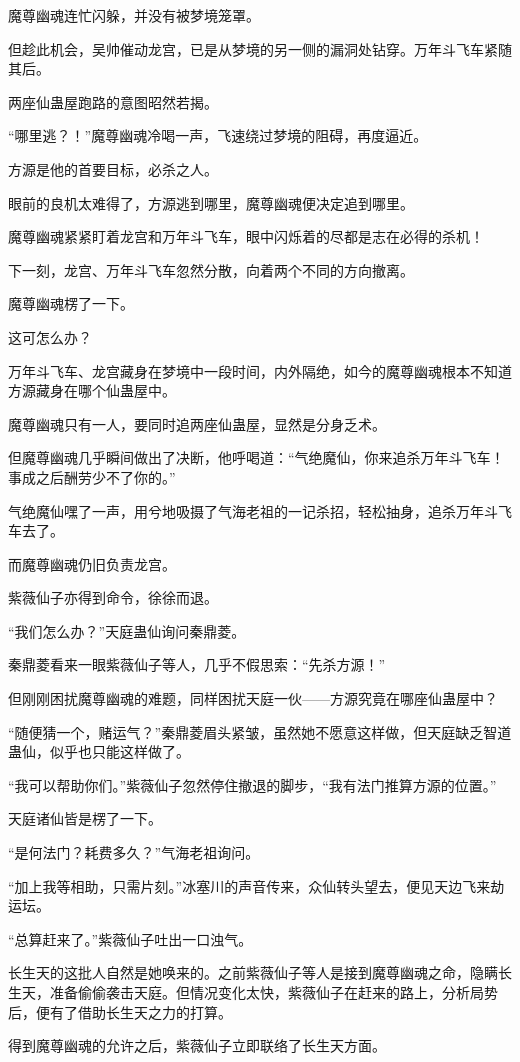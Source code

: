 \begin{this_body}
魔尊幽魂连忙闪躲，并没有被梦境笼罩。

但趁此机会，吴帅催动龙宫，已是从梦境的另一侧的漏洞处钻穿。万年斗飞车紧随其后。

两座仙蛊屋跑路的意图昭然若揭。

“哪里逃？！”魔尊幽魂冷喝一声，飞速绕过梦境的阻碍，再度逼近。

方源是他的首要目标，必杀之人。

眼前的良机太难得了，方源逃到哪里，魔尊幽魂便决定追到哪里。

魔尊幽魂紧紧盯着龙宫和万年斗飞车，眼中闪烁着的尽都是志在必得的杀机！

下一刻，龙宫、万年斗飞车忽然分散，向着两个不同的方向撤离。

魔尊幽魂楞了一下。

这可怎么办？

万年斗飞车、龙宫藏身在梦境中一段时间，内外隔绝，如今的魔尊幽魂根本不知道方源藏身在哪个仙蛊屋中。

魔尊幽魂只有一人，要同时追两座仙蛊屋，显然是分身乏术。

但魔尊幽魂几乎瞬间做出了决断，他呼喝道：“气绝魔仙，你来追杀万年斗飞车！事成之后酬劳少不了你的。”

气绝魔仙嘿了一声，用兮地吸摄了气海老祖的一记杀招，轻松抽身，追杀万年斗飞车去了。

而魔尊幽魂仍旧负责龙宫。

紫薇仙子亦得到命令，徐徐而退。

“我们怎么办？”天庭蛊仙询问秦鼎菱。

秦鼎菱看来一眼紫薇仙子等人，几乎不假思索：“先杀方源！”

但刚刚困扰魔尊幽魂的难题，同样困扰天庭一伙——方源究竟在哪座仙蛊屋中？

“随便猜一个，赌运气？”秦鼎菱眉头紧皱，虽然她不愿意这样做，但天庭缺乏智道蛊仙，似乎也只能这样做了。

“我可以帮助你们。”紫薇仙子忽然停住撤退的脚步，“我有法门推算方源的位置。”

天庭诸仙皆是楞了一下。

“是何法门？耗费多久？”气海老祖询问。

“加上我等相助，只需片刻。”冰塞川的声音传来，众仙转头望去，便见天边飞来劫运坛。

“总算赶来了。”紫薇仙子吐出一口浊气。

长生天的这批人自然是她唤来的。之前紫薇仙子等人是接到魔尊幽魂之命，隐瞒长生天，准备偷偷袭击天庭。但情况变化太快，紫薇仙子在赶来的路上，分析局势后，便有了借助长生天之力的打算。

得到魔尊幽魂的允许之后，紫薇仙子立即联络了长生天方面。


\end{this_body}
